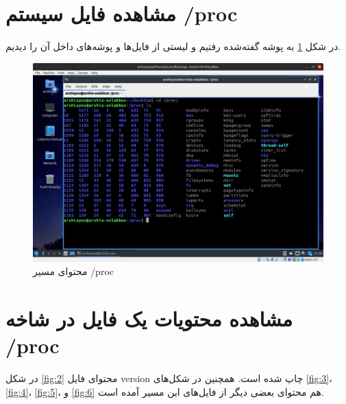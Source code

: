 \documentclass[12pt]{article}
\begin{document}
	\section{مشاهده فایل سیستم \textenglish{/proc}}
	در شکل \ref{fig:1} به پوشه گفته‌شده رفتیم و لیستی از فایل‌ها و پوشه‌های داخل آن را دیدیم.
	\begin{figure}[H]
		\centering
		\includegraphics[width=\textwidth]{report3-resources/1.png}
		\caption{محتوای مسیر \textenglish{/proc}}
		\label{fig:1}
	\end{figure}
	
	
	\section{مشاهده محتویات یک فایل در شاخه \textenglish{/proc}}
	در شکل \ref{fig:2} محتوای فایل version چاپ شده است. همچنین در شکل‌های \ref{fig:3}، 
	\ref{fig:4}،
	\ref{fig:5}، و
	\ref{fig:6}
	هم محتوای بعضی دیگر از فایل‌های این مسیر آمده است.
	
\end{document}

